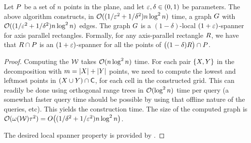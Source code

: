 \documentclass[12pt]{article}%
\begin{document}
\begin{theorem}
    Let $P$ be a set of $n$ points in the plane, and let
    $\varepsilon, \delta \in (0,1)$ be parameters. The above algorithm
    constructs, in $\mathcal{O}((1/\varepsilon^2 + 1/\delta^2) n \log^2 n)$ time, a
    graph $G$ with $\mathcal{O}((1/\varepsilon^2 + 1/\delta^2) n \log^2 n)$ edges. The
    graph $G$ is a $(1-\delta)$-local $(1+\varepsilon)$-spanner for axis
    parallel rectangles. Formally, for any axis-parallel rectangle
    $R$, we have that $R \cap P$ is an $(1+\varepsilon)$-spanner
    for all the points of $\bigl((1-\delta)R \bigr)\cap P$.
\end{theorem}
\begin{proof}
    Computing the \QSPD $\mathcal{W}$ takes $\mathcal{O}(n \log^2 n)$ time. For each
    pair $\{X, Y\}$ in the decomposition with
    $m = |X| + |Y|$ points, we need to compute the lowest and
    leftmost points in $(X \cup Y) \cap \mathsf{C}$, for each cell in
    the constructed grid. This can readily be done using orthogonal
    range trees in $\mathcal{O}( \log^2 n)$ time per query (a somewhat faster
    query time should be possible by using that offline nature of the
    queries, etc). This yields the construction time. The size of the
    computed graph is
    $\Of(\WeightX{\WS} \gConst^2) = O\bigl((1/\delta^2 + 1/\eps^2) n
    \log^2 n\bigr)$.

    The desired local spanner property is provided by
    .
\end{proof}









% 

\end{document}
